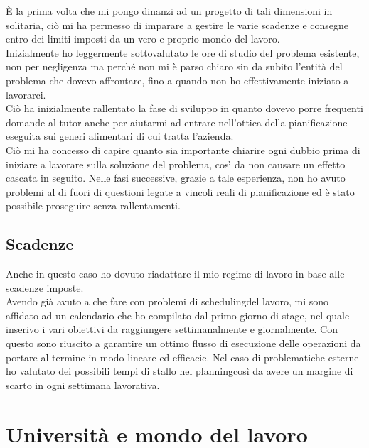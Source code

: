 È la prima volta che mi pongo dinanzi ad un progetto di tali dimensioni in solitaria, ciò mi ha permesso di imparare a gestire le varie scadenze e consegne entro dei limiti
imposti da un vero e proprio mondo del lavoro. \\Inizialmente ho leggermente sottovalutato le ore di studio del problema esistente, non per negligenza ma perché non mi è parso
chiaro sin da subito l'entità del problema che dovevo affrontare, fino a quando non ho effettivamente iniziato a lavorarci.\\ Ciò ha inizialmente rallentato la fase di sviluppo
in quanto dovevo porre frequenti domande al tutor anche per aiutarmi ad entrare nell'ottica della pianificazione eseguita sui generi alimentari di cui tratta l'azienda.\\ Ciò mi
ha concesso di capire quanto sia importante chiarire ogni dubbio prima di iniziare a lavorare sulla soluzione del problema, così da non causare un effetto cascata in seguito.
Nelle fasi successive, grazie a tale esperienza, non ho avuto problemi al di fuori di questioni legate a vincoli reali di pianificazione ed è stato possibile proseguire senza
rallentamenti.

\subsection{Scadenze}

Anche in questo caso ho dovuto riadattare il mio regime di lavoro in base alle scadenze imposte.\\ Avendo già avuto a che fare con problemi di scheduling\glosp del lavoro,
mi sono affidato ad un calendario che ho compilato dal primo giorno di stage, nel quale inserivo i vari obiettivi da raggiungere settimanalmente e giornalmente. Con questo
sono riuscito a garantire un ottimo flusso di esecuzione delle operazioni da portare al termine in modo lineare ed efficacie. Nel caso di problematiche esterne ho valutato dei
possibili tempi di stallo nel planning\glosp così da avere un margine di scarto in ogni settimana lavorativa.

\section{Università e mondo del lavoro}

